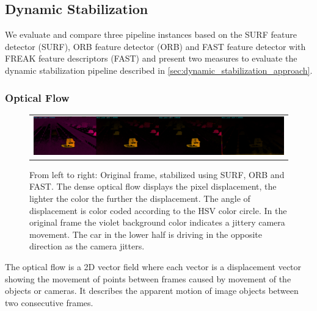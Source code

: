 \subsection{Dynamic Stabilization}
\label{sec:evaluation_dynamic_stabilization}
We evaluate and compare three pipeline instances based on the SURF \cite{bay10.1007/11744023_32,opencv_library} feature detector (SURF), 
ORB \cite{rublee6126544, opencv_library} feature detector (ORB) and FAST \cite{Ghahremani_2021,opencv_library} feature detector with FREAK \cite{alahi6247715,opencv_library} feature descriptors (FAST) 
and present two measures to evaluate the dynamic stabilization pipeline described in \autoref{sec:dynamic_stabilization_approach}.


\subsubsection{Optical Flow}
\begin{figure}[!ht]
    \centering
    \begin{tabular}{c}
      \includegraphics[width=0.95\linewidth]{images/frame_1317_cropped.png}    
    \end{tabular}
    \caption{
        From left to right: Original frame, stabilized using SURF, ORB and FAST.
        The dense optical flow displays the pixel displacement, the lighter the color the further the displacement. 
        The angle of displacement is color coded according to the HSV color circle.  
        In the original frame the violet background color indicates a jittery camera movement. 
        The car in the lower half is driving in the opposite direction as the camera jitters. 
    }
    \label{fig:optical_flow_example}
\end{figure}

The optical flow is a 2D vector field where each vector is a displacement vector showing the movement of points between frames caused by movement of the objects or cameras.
It describes the apparent motion of image objects between two consecutive frames. 

